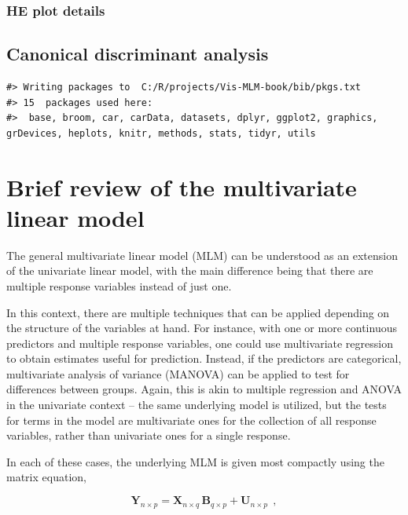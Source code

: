 \documentclass[
  letterpaper,
  10pt,
  krantz2]{krantz}
\begin{document}
\hypertarget{he-plot-details}{%
\subsection{HE plot details}\label{he-plot-details}}

\hypertarget{sec-candisc}{%
\section{Canonical discriminant analysis}\label{sec-candisc}}

\begin{verbatim}
#> Writing packages to  C:/R/projects/Vis-MLM-book/bib/pkgs.txt
#> 15  packages used here:
#>  base, broom, car, carData, datasets, dplyr, ggplot2, graphics, grDevices, heplots, knitr, methods, stats, tidyr, utils
\end{verbatim}


\hypertarget{sec-mlm-review}{%
\chapter{Brief review of the multivariate linear
model}\label{sec-mlm-review}}

The general multivariate linear model (MLM) can be understood as an
extension of the univariate linear model, with the main difference being
that there are multiple response variables instead of just one.

In this context, there are multiple techniques that can be applied
depending on the structure of the variables at hand. For instance, with
one or more continuous predictors and multiple response variables, one
could use multivariate regression to obtain estimates useful for
prediction. Instead, if the predictors are categorical, multivariate
analysis of variance (MANOVA) can be applied to test for differences
between groups. Again, this is akin to multiple regression and ANOVA in
the univariate context -- the same underlying model is utilized, but the
tests for terms in the model are multivariate ones for the collection of
all response variables, rather than univariate ones for a single
response.

In each of these cases, the underlying MLM is given most compactly using
the matrix equation,

\[
\mathbf{Y}_{n \times p} = 
\mathbf{X}_{n \times q} \, \mathbf{B}_{q \times p} + \mathbf{U}_{n \times p} \:\: ,
\]
\end{document}
